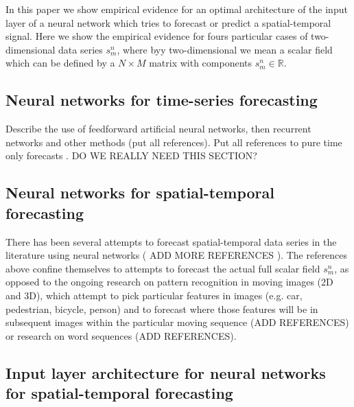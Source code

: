 \documentclass[journal]{IEEEtran}
\begin{document}
In this paper we show empirical evidence for an optimal architecture of the input layer of a neural network which tries
to forecast or predict a spatial-temporal signal. Here we show the empirical evidence for fours particular cases of
two-dimensional data series $s^n_m$, where byy two-dimensional we mean a scalar field which can be
defined by a $N\times M$ matrix with components $s^n_m \in \mathbb{R}$.

\subsection{Neural networks for time-series forecasting}

Describe the use of feedforward artificial neural networks, then recurrent networks and other methods (put all references).
Put all references to pure time only forecasts \cite{McCulloch1943}. DO WE REALLY NEED THIS SECTION?

\subsection{Neural networks for spatial-temporal forecasting}

There has been several attempts to forecast spatial-temporal data series in the literature using neural networks ( ADD MORE REFERENCES 
\cite{2017arXiv170805094M, 2017arXiv171100636M, 2017arXiv171205293C, ghaderi2017deepforecast}). The references above confine themselves 
to attempts to forecast the actual full scalar field $s^n_m$, as opposed to the ongoing research on pattern recognition in moving 
images (2D and 3D), which attempt to pick particular features in images (e.g. car, pedestrian, bicycle, person) and to forecast where 
those features will be in subsequent images within the particular moving sequence (ADD REFERENCES) or research on word sequences (ADD 
REFERENCES).

\subsection{Input layer architecture for neural networks for spatial-temporal forecasting}
\end{document}
